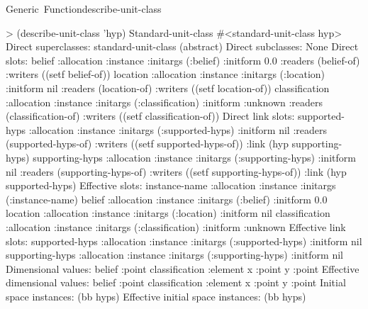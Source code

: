 \documentclass[10pt,twoside,english,pdftex]{article}
\begin{document}
\begin{functiondoc}{Generic~Function}{describe-unit-class}
\fnexample
\begin{example}
> (describe-unit-class 'hyp)
Standard-unit-class #<standard-unit-class hyp>
  Direct superclasses: 
    standard-unit-class (abstract)
  Direct subclasses: None
  Direct slots:
    belief
      :allocation :instance
      :initargs (:belief)
      :initform 0.0
      :readers (belief-of)
      :writers ((setf belief-of))
    location
      :allocation :instance
      :initargs (:location)
      :initform nil
      :readers (location-of)
      :writers ((setf location-of))
    classification
      :allocation :instance
      :initargs (:classification)
      :initform :unknown
      :readers (classification-of)
      :writers ((setf classification-of))
  Direct link slots:
    supported-hyps
      :allocation :instance
      :initargs (:supported-hyps)
      :initform nil
      :readers (supported-hyps-of)
      :writers ((setf supported-hyps-of))
      :link (hyp supporting-hyps)
    supporting-hyps
      :allocation :instance
      :initargs (:supporting-hyps)
      :initform nil
      :readers (supporting-hyps-of)
      :writers ((setf supporting-hyps-of))
      :link (hyp supported-hyps)
  Effective slots:
    instance-name
      :allocation :instance
      :initargs (:instance-name)
    belief
      :allocation :instance
      :initargs (:belief)
      :initform 0.0
    location
      :allocation :instance
      :initargs (:location)
      :initform nil
    classification
      :allocation :instance
      :initargs (:classification)
      :initform :unknown
  Effective link slots:
    supported-hyps
      :allocation :instance
      :initargs (:supported-hyps)
      :initform nil
    supporting-hyps
      :allocation :instance
      :initargs (:supporting-hyps)
      :initform nil
  Dimensional values:
      belief :point
      classification :element
      x :point
      y :point
  Effective dimensional values:
      belief :point
      classification :element
      x :point
      y :point
  Initial space instances:
    (bb hyps)
  Effective initial space instances:
    (bb hyps)
\end{example}

\end{functiondoc}

\end{document}
